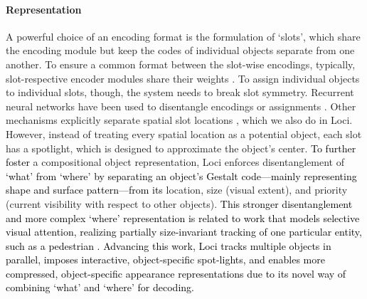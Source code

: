 \documentclass{article} \usepackage{iclr2023_conference_arxiv,times}
\newcommand{\changed}{\textcolor{black}}
\begin{document}
\paragraph{Representation}
A powerful choice of an encoding format is the formulation of `slots', which share the encoding module but keep the codes of individual objects separate from one another.
To ensure a common format between the slot-wise encodings, 
typically, slot-respective encoder modules share their weights \citep{bertinetto2016fully, Locatello:2020, vaswani2017attention}.
To assign individual objects to individual slots, though, the system needs to break slot symmetry.
Recurrent neural networks have been used to disentangle encodings or assignments \citep{burgess19monet, engelcke19genesis, eslami16air,  greff19multiobject, Locatello:2020}.
Other mechanisms explicitly separate spatial slot locations \citep{crawford19pineau, jiang20scalor, lin20space}, which we also do in Loci. 
However, instead of treating every spatial location as a potential object, each slot has a spotlight, which is designed to approximate the object's center. 
\changed{To further foster}
a compositional object representation,
Loci enforces disentanglement of \changed{`what' from `where' by separating an object's Gestalt code---mainly representing shape and surface pattern---from its} location, size (visual extent), and priority (current visibility with respect to other objects).
\changed{This stronger disentanglement and more complex `where' representation is related to work that models selective visual attention, realizing partially size-invariant tracking of one particular entity, such as a pedestrian \cite{Denil:2012,Kahou:2017,Ranzato:2014}.
Advancing this work, Loci tracks multiple objects in parallel, imposes interactive, object-specific spot-lights, and enables more compressed, object-specific appearance representations due to its novel way of combining `what' and `where' for decoding.}
\end{document}
